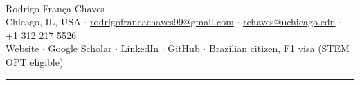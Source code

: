 \begin{center}
  {\LARGE\bfseries \cvtitle}\\[3pt]
  {\large Rodrigo França Chaves}\\[3pt]
  {\small
    Chicago, IL, USA \enspace$\cdot$\enspace
    \href{mailto:rodrigofrancachaves99@gmail.com}{rodrigofrancachaves99@gmail.com} \enspace$\cdot$\enspace
    \href{mailto:rchaves@uchicago.edu}{rchaves@uchicago.edu} \enspace$\cdot$\enspace
    +1 312 217 5526
  }\\[1.5pt]
  {\small
    \href{https://rodrigofch7.github.io}{Website} \enspace$\cdot$\enspace
    \href{https://scholar.google.com.br/citations?user=6D65dqUAAAAJ}{Google Scholar} \enspace$\cdot$\enspace
    \href{https://www.linkedin.com/in/rodrigofrancac}{LinkedIn} \enspace$\cdot$\enspace
    \href{https://github.com/Rodrigofch7}{GitHub} \enspace$\cdot$\enspace
    Brazilian citizen, F1 visa (STEM OPT eligible)
  }
\end{center}

\vspace{1pt}
{\rule{\linewidth}{0.8pt}}
\vspace{3pt}
